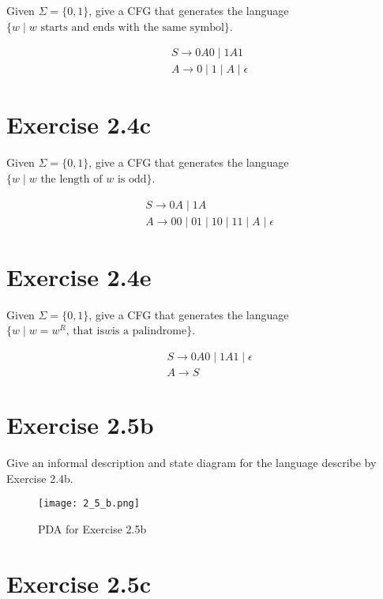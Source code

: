 \documentclass{article}
\newcommand{\where}{\mid}
\begin{document}
Given $\Sigma = \{0, 1\}$, give a CFG that generates the language $\{ w \where
w \text{ starts and ends with the same symbol} \}$.

\begin{align*}
	&S \rightarrow 0A0 \mid 1A1\\
	&A \rightarrow 0 \mid 1 \mid A \mid \epsilon
\end{align*}

\section{Exercise 2.4c}

Given $\Sigma = \{0, 1\}$, give a CFG that generates the language $\{ w \where
w \text{ the length of } w \text{ is odd} \}$.

\begin{align*}
	&S \rightarrow 0A \mid 1A\\
	&A \rightarrow 00 \mid 01 \mid 10 \mid 11 \mid A \mid \epsilon
\end{align*}

\section{Exercise 2.4e}

Given $\Sigma = \{0, 1\}$, give a CFG that generates the language $\{ w \where
w = w^R \text{, that is} w \text{is a palindrome} \}$.

\begin{align*}
	&S \rightarrow 0A0 \mid 1A1 \mid \epsilon\\
	&A \rightarrow S
\end{align*}

\section{Exercise 2.5b}

Give an informal description and state diagram for the language describe by
Exercise 2.4b.

\begin{figure}[h!]
	\centering
	\texttt{[image: 2\_5\_b.png]}
	\caption{PDA for Exercise 2.5b}
\end{figure}

\pagebreak

\section{Exercise 2.5c}
\end{document}
